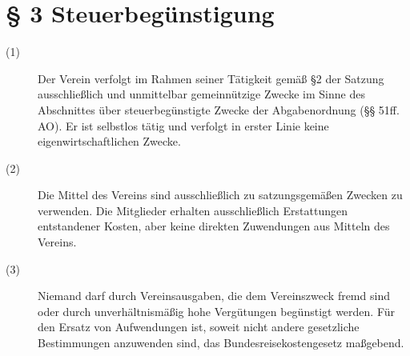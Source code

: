 \documentclass[a4paper,12pt]{scrartcl}
\begin{document}
\section*{\S{} 3 Steuerbegünstigung}
\begin{description} 

\item[(1)] Der Verein verfolgt im Rahmen seiner Tätigkeit gemäß §2 der Satzung ausschließlich und unmittelbar gemeinnützige Zwecke im Sinne des Abschnittes über steuerbegünstigte Zwecke der Abgabenordnung (§§ 51ff. AO). Er ist selbstlos tätig und verfolgt in erster Linie keine eigenwirtschaftlichen Zwecke.
\item[(2)] Die Mittel des Vereins sind ausschließlich zu satzungsgemäßen Zwecken zu verwenden. Die Mitglieder erhalten ausschließlich Erstattungen entstandener Kosten, aber keine direkten Zuwendungen aus Mitteln des Vereins.
\item[(3)] Niemand darf durch Vereinsausgaben, die dem Vereinszweck fremd sind oder durch unverhältnismäßig hohe Vergütungen begünstigt werden. Für den Ersatz von Aufwendungen ist, soweit nicht andere gesetzliche Bestimmungen anzuwenden sind, das Bundesreisekostengesetz maßgebend.

\end{description}
\end{document}
